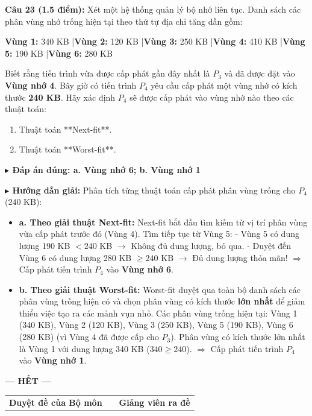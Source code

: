 \documentclass[11pt,a4paper]{article}
\newcommand{\giaithich}[2]{%
    \par\vspace{0.15cm}\noindent
    \begingroup\small
    \noindent\textbf{\color{blue}$\blacktriangleright$ Đáp án đúng: #1} \par\vspace{0.08cm}
    \noindent\textbf{\color{teal}$\blacktriangleright$ Hướng dẫn giải:} #2
    \endgroup\par\vspace{0.35cm}
}
\begin{document}
\vspace{0.3cm}
\noindent\textbf{Câu 23 (1.5 điểm):}
Xét một hệ thống quản lý bộ nhớ liên tục. Danh sách các phân vùng nhớ trống hiện tại theo thứ tự địa chỉ tăng dần gồm:
\begin{center}
\textbf{Vùng 1:} 340 KB \quad|\quad \textbf{Vùng 2:} 120 KB \quad|\quad \textbf{Vùng 3:} 250 KB \quad|\quad \textbf{Vùng 4:} 410 KB \quad|\quad \textbf{Vùng 5:} 190 KB \quad|\quad \textbf{Vùng 6:} 280 KB
\end{center}
Biết rằng tiến trình vừa được cấp phát gần đây nhất là $P_3$ và đã được đặt vào \textbf{Vùng nhớ 4}.
Bây giờ có tiến trình $P_4$ yêu cầu cấp phát một vùng nhớ có kích thước \textbf{240 KB}. Hãy xác định $P_4$ sẽ được cấp phát vào vùng nhớ nào theo các thuật toán:
\begin{enumerate}[label=\alph*.,leftmargin=1.5em]
    \item Thuật toán **Next-fit**.
    \item Thuật toán **Worst-fit**.
\end{enumerate}
\giaithich{a. Vùng nhớ 6; b. Vùng nhớ 1}{Phân tích từng thuật toán cấp phát phân vùng trống cho $P_4$ ($240\text{ KB}$):
\begin{itemize}[leftmargin=1.5em]
    \item \textbf{a. Theo giải thuật Next-fit:}
    Next-fit bắt đầu tìm kiếm từ vị trí phân vùng vừa cấp phát trước đó (Vùng 4).
    Tìm tiếp tục từ Vùng 5:
    - Vùng 5 có dung lượng 190 KB $< 240$ KB $\rightarrow$ Không đủ dung lượng, bỏ qua.
    - Duyệt đến Vùng 6 có dung lượng 280 KB $\ge 240$ KB $\rightarrow$ Đủ dung lượng thỏa mãn!
    $\Rightarrow$ Cấp phát tiến trình $P_4$ vào \textbf{Vùng nhớ 6}.
    
    \item \textbf{b. Theo giải thuật Worst-fit:}
    Worst-fit duyệt qua toàn bộ danh sách các phân vùng trống hiện có và chọn phân vùng có kích thước \textbf{lớn nhất} để giảm thiểu việc tạo ra các mảnh vụn nhỏ.
    Các phân vùng trống hiện tại: Vùng 1 (340 KB), Vùng 2 (120 KB), Vùng 3 (250 KB), Vùng 5 (190 KB), Vùng 6 (280 KB) (vì Vùng 4 đã được cấp cho $P_3$).
    Phân vùng có kích thước lớn nhất là Vùng 1 với dung lượng 340 KB ($340 \ge 240$).
    $\Rightarrow$ Cấp phát tiến trình $P_4$ vào \textbf{Vùng nhớ 1}.
\end{itemize}}

\vspace{0.5cm}
\begin{center}
    \textbf{--- HẾT ---}
\end{center}

\vspace{0.5cm}
\noindent
\begin{tabularx}{\textwidth}{X c X}
\centering\textbf{Duyệt đề của Bộ môn} & & \centering\textbf{Giảng viên ra đề}\tabularnewline
\end{tabularx}
\end{document}
